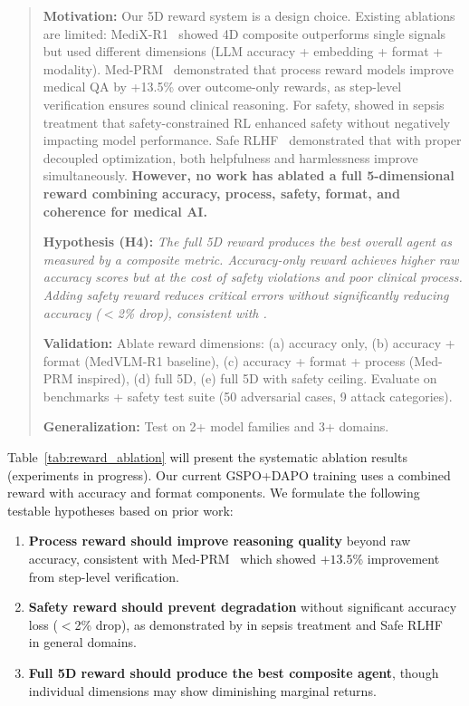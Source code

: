 \documentclass{article}
\begin{document}
\begin{quote}
\textbf{Motivation:} Our 5D reward system is a design choice. Existing ablations are limited: MediX-R1~\citep{medixr1} showed 4D composite outperforms single signals but used different dimensions (LLM accuracy + embedding + format + modality). Med-PRM~\citep{zhang2025medprm} demonstrated that process reward models improve medical QA by +13.5\% over outcome-only rewards, as step-level verification ensures sound clinical reasoning. For safety, \citet{festor2022safety} showed in sepsis treatment that safety-constrained RL enhanced safety without negatively impacting model performance. Safe RLHF~\citep{dai2024saferlhf} demonstrated that with proper decoupled optimization, both helpfulness and harmlessness improve simultaneously. \textbf{However, no work has ablated a full 5-dimensional reward combining accuracy, process, safety, format, and coherence for medical AI.}

\textbf{Hypothesis (H4):} \textit{The full 5D reward produces the best overall agent as measured by a composite metric. Accuracy-only reward achieves higher raw accuracy scores but at the cost of safety violations and poor clinical process. Adding safety reward reduces critical errors without significantly reducing accuracy ($<$2\% drop), consistent with \citet{festor2022safety}.}

\textbf{Validation:} Ablate reward dimensions: (a) accuracy only, (b) accuracy + format (MedVLM-R1 baseline), (c) accuracy + format + process (Med-PRM inspired), (d) full 5D, (e) full 5D with safety ceiling. Evaluate on benchmarks + safety test suite (50 adversarial cases, 9 attack categories).

\textbf{Generalization:} Test on 2+ model families and 3+ domains.
\end{quote}

Table~\ref{tab:reward_ablation} will present the systematic ablation results (experiments in progress). Our current GSPO+DAPO training uses a combined reward with accuracy and format components. We formulate the following testable hypotheses based on prior work:

\begin{enumerate}[nosep, leftmargin=*]
    \item \textbf{Process reward should improve reasoning quality} beyond raw accuracy, consistent with Med-PRM~\citep{zhang2025medprm} which showed $+13.5$\% improvement from step-level verification.
    \item \textbf{Safety reward should prevent degradation} without significant accuracy loss ($<$2\% drop), as demonstrated by \citet{festor2022safety} in sepsis treatment and Safe RLHF~\citep{dai2024saferlhf} in general domains.
    \item \textbf{Full 5D reward should produce the best composite agent}, though individual dimensions may show diminishing marginal returns.
\end{enumerate}
\end{document}
